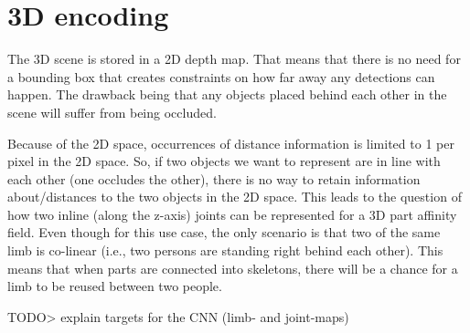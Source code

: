 \section{3D encoding}
The 3D scene is stored in a 2D depth map. That means that there is no need for a bounding box that creates constraints on how far away any detections can happen. The drawback being that any objects placed behind each other in the scene will suffer from being occluded.

Because of the 2D space, occurrences of distance information is limited to 1 per pixel in the 2D space. So, if two objects we want to represent are in line with each other (one occludes the other), there is no way to retain information about/distances to the two objects in the 2D space.
This leads to the question of how two inline (along the z-axis) joints can be represented for a 3D part affinity field. Even though for this use case, the only scenario is that two of the same limb is co-linear (i.e., two persons are standing right behind each other). This means that when parts are connected into skeletons, there will be a chance for a limb to be reused between two people.


TODO> explain targets for the CNN (limb- and joint-maps)







